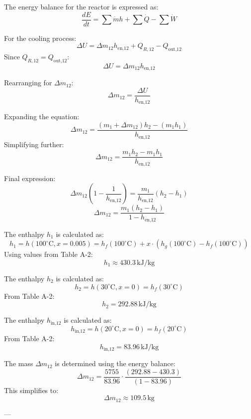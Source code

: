 The energy balance for the reactor is expressed as:  
\[
\frac{dE}{dt} = \sum \dot{m} h + \sum \dot{Q} - \sum \dot{W}
\]  

For the cooling process:  
\[
\Delta U = \Delta m_{12} h_{\text{en,12}} + Q_{R,12} - Q_{\text{out,12}}
\]  
Since \( Q_{R,12} = Q_{\text{out,12}} \):  
\[
\Delta U = \Delta m_{12} h_{\text{en,12}}
\]  

Rearranging for \( \Delta m_{12} \):  
\[
\Delta m_{12} = \frac{\Delta U}{h_{\text{en,12}}}
\]  

Expanding the equation:  
\[
\Delta m_{12} = \frac{(m_1 + \Delta m_{12}) h_2 - (m_1 h_1)}{h_{\text{en,12}}}
\]  
Simplifying further:  
\[
\Delta m_{12} = \frac{m_1 h_2 - m_1 h_1}{h_{\text{en,12}}}
\]  

Final expression:  
\[
\Delta m_{12} \left( 1 - \frac{1}{h_{\text{en,12}}} \right) = \frac{m_1}{h_{\text{en,12}}} (h_2 - h_1)
\]  
\[
\Delta m_{12} = \frac{m_1 (h_2 - h_1)}{1 - h_{\text{en,12}}}
\]

The enthalpy \( h_1 \) is calculated as:  
\[
h_1 = h(100^\circ\text{C}, x = 0.005) = h_f(100^\circ\text{C}) + x \cdot \left(h_g(100^\circ\text{C}) - h_f(100^\circ\text{C})\right)
\]  
Using values from Table A-2:  
\[
h_1 \approx 430.3 \, \text{kJ/kg}
\]  

The enthalpy \( h_2 \) is calculated as:  
\[
h_2 = h(30^\circ\text{C}, x = 0) = h_f(30^\circ\text{C})
\]  
From Table A-2:  
\[
h_2 = 292.88 \, \text{kJ/kg}
\]  

The enthalpy \( h_{\text{in,12}} \) is calculated as:  
\[
h_{\text{in,12}} = h(20^\circ\text{C}, x = 0) = h_f(20^\circ\text{C})
\]  
From Table A-2:  
\[
h_{\text{in,12}} = 83.96 \, \text{kJ/kg}
\]  

The mass \( \Delta m_{12} \) is determined using the energy balance:  
\[
\Delta m_{12} = \frac{5755}{83.96} \cdot \frac{(292.88 - 430.3)}{(1 - 83.96)}
\]  
This simplifies to:  
\[
\Delta m_{12} \approx 109.5 \, \text{kg}
\]  

---